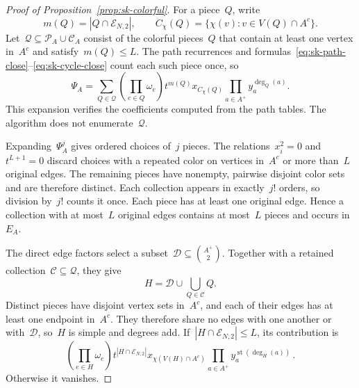 \documentclass[letterpaper,11pt,reqno]{amsart}
\renewcommand{\leq}{\leqslant}
\DeclareMathOperator{\degstate}{st}
\begin{document}
\begin{proof}[Proof of Proposition~\ref{prop:sk-colorful}]
 For a piece~$Q$, write
\begin{equation*}
m(Q)=|Q\cap\mathcal E_{N,2}|,\qquad
C_\chi(Q)=\{\chi(v):v\in V(Q)\cap A^c\}.
\end{equation*}
Let~$\mathcal Q\subseteq\mathscr P_A\cup\mathscr C_A$ consist of the colorful pieces~$Q$ that contain at least one vertex in~$A^c$ and satisfy~$m(Q)\leq L$. The path recurrences and formulas~\eqref{eq:sk-path-close}--\eqref{eq:sk-cycle-close} count each such piece once, so
\begin{equation*}
\Psi_A=\sum_{Q\in\mathcal Q}
\left(\prod_{e\in Q}\omega_e\right)
t^{m(Q)}x_{C_\chi(Q)}\prod_{a\in A^+}y_a^{\deg_Q(a)}.
\end{equation*}
This expansion verifies the coefficients computed from the path tables. The algorithm does not enumerate~$\mathcal Q$.

Expanding~$\Psi_A^j$ gives ordered choices of~$j$ pieces. The relations~$x_i^2=0$ and~$t^{L+1}=0$ discard choices with a repeated color on vertices in~$A^c$ or more than~$L$ original edges. The remaining pieces have nonempty, pairwise disjoint color sets and are therefore distinct. Each collection appears in exactly~$j!$ orders, so division by~$j!$ counts it once. Each piece has at least one original edge. Hence a collection with at most~$L$ original edges contains at most~$L$ pieces and occurs in~$E_A$.

The direct edge factors select a subset~$\mathcal D\subseteq\binom{A^+}{2}$. Together with a retained collection~$\mathcal C\subseteq\mathcal Q$, they give
\begin{equation*}
H=\mathcal D\cup\bigcup_{Q\in\mathcal C}Q.
\end{equation*}
Distinct pieces have disjoint vertex sets in~$A^c$, and each of their edges has at least one endpoint in~$A^c$. They therefore share no edges with one another or with~$\mathcal D$, so~$H$ is simple and degrees add. If~$|H\cap\mathcal E_{N,2}|\leq L$, its contribution is
\begin{equation*}
\left(\prod_{e\in H}\omega_e\right)
t^{|H\cap\mathcal E_{N,2}|}
x_{\chi(V(H)\cap A^c)}
\prod_{a\in A^+}y_a^{\degstate(\deg_H(a))}\,.
\end{equation*}
Otherwise it vanishes.


\end{proof}
\end{document}
